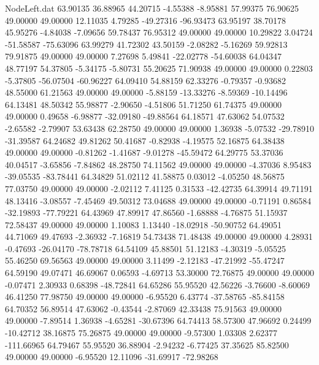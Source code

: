 \begin{filecontents}{NodeLeft.dat}
  63.90135   36.88965   44.20715    -4.55388   -8.95881   57.99375   76.90625   49.00000   49.00000   12.11035    4.79285  -49.27316  -96.93473
  63.95197   38.70178   45.95276    -4.84038   -7.09656   59.78437   76.95312   49.00000   49.00000   10.29822    3.04724  -51.58587  -75.63096
  63.99279   41.72302   43.50159    -2.08282   -5.16269   59.92813   79.91875   49.00000   49.00000    7.27698    5.49841  -22.02778  -54.60038
  64.04347   48.77197   54.37805    -5.34175   -5.80731   55.20625   71.90938   49.00000   49.00000    0.22803   -5.37805  -56.07504  -60.96227
  64.09410   54.88159   62.33276    -0.79357   -0.93682   48.55000   61.21563   49.00000   49.00000   -5.88159  -13.33276   -8.59369  -10.14496
  64.13481   48.50342   55.98877    -2.90650   -4.51806   51.71250   61.74375   49.00000   49.00000    0.49658   -6.98877  -32.09180  -49.88564
  64.18571   47.63062   54.07532    -2.65582   -2.79907   53.63438   62.28750   49.00000   49.00000    1.36938   -5.07532  -29.78910  -31.39587
  64.24682   49.81262   50.41687    -0.82938   -4.19575   52.16875   64.38438   49.00000   49.00000   -0.81262   -1.41687   -9.01278  -45.59472
  64.29775   53.37036   40.04517    -3.65856   -7.84862   48.28750   74.11562   49.00000   49.00000   -4.37036    8.95483  -39.05535  -83.78441
  64.34829   51.02112   41.58875     0.03012   -4.05250   48.56875   77.03750   49.00000   49.00000   -2.02112    7.41125    0.31533  -42.42735
  64.39914   49.71191   48.13416    -3.08557   -7.45469   49.50312   73.04688   49.00000   49.00000   -0.71191    0.86584  -32.19893  -77.79221
  64.43969   47.89917   47.86560    -1.68888   -4.76875   51.15937   72.58437   49.00000   49.00000    1.10083    1.13440  -18.02918  -50.90752
  64.49051   44.71069   49.47693    -2.36932   -7.16819   54.73438   71.48438   49.00000   49.00000    4.28931   -0.47693  -26.04170  -78.78718
  64.54109   45.88501   51.12183    -4.30319   -5.05525   55.46250   69.56563   49.00000   49.00000    3.11499   -2.12183  -47.21992  -55.47247
  64.59190   49.07471   46.69067     0.06593   -4.69713   53.30000   72.76875   49.00000   49.00000   -0.07471    2.30933    0.68398  -48.72841
  64.65286   55.95520   42.56226    -3.76600   -8.60069   46.41250   77.98750   49.00000   49.00000   -6.95520    6.43774  -37.58765  -85.84158
  64.70352   56.89514   47.63062    -0.43544   -2.87069   42.33438   75.91563   49.00000   49.00000   -7.89514    1.36938   -4.65281  -30.67396
  64.74413   58.57300   47.96692     0.24499  -10.42712   38.16875   75.26875   49.00000   49.00000   -9.57300    1.03308    2.62377 -111.66965
  64.79467   55.95520   36.88904    -2.94232   -6.77425   37.35625   85.82500   49.00000   49.00000   -6.95520   12.11096  -31.69917  -72.98268

\end{filecontents}
